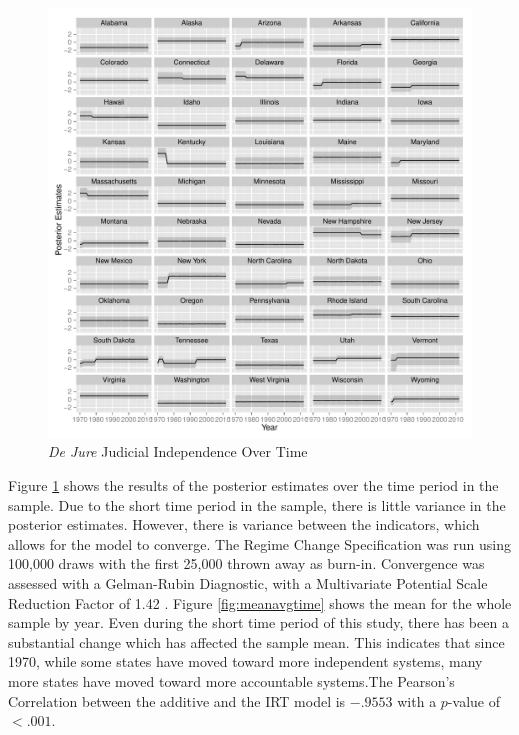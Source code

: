 \documentclass[12pt]{article}
\begin{document}
\begin{figure}
	\centering\caption{\textit{De Jure} Judicial Independence Over Time}
	\label{fig:fiveind_timeplot}
	\includegraphics[scale=.8]{graphics/fiveind/fiveind_timeplot}
\end{figure}

Figure \ref{fig:fiveind_timeplot} shows the results of the posterior estimates over the time period in the sample.  Due to the short time period in the sample, there is little variance in the posterior estimates.  However, there is variance between the indicators, which allows for the model to converge.  The Regime Change Specification was run using 100,000 draws with the first 25,000 thrown away as burn-in.  Convergence was assessed with a Gelman-Rubin Diagnostic, with a Multivariate Potential Scale Reduction Factor of 1.42 \citep{Gelman1992}.  Figure \ref{fig:meanavgtime} shows the mean for the whole sample by year.  Even during the short time period of this study, there has been a substantial change which has affected the sample mean.  This indicates that since 1970, while some states have moved toward more independent systems, many more states have moved toward more accountable systems.The Pearson's Correlation between the additive and the IRT model is $-.9553$ with a $p$-value of $<.001$.
\end{document}
